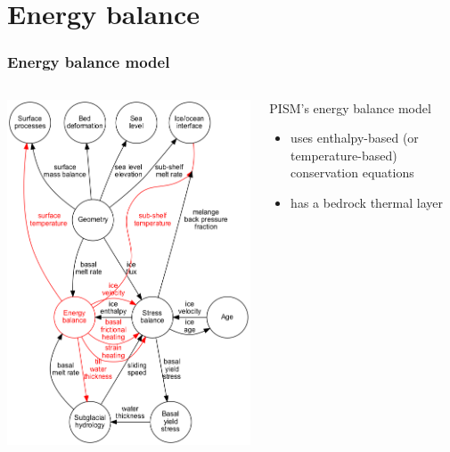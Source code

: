 \documentclass[hide notes,intlimits]{beamer}
\begin{document}
\section{Energy balance}
\label{sec:energy-balance}

\begin{frame}
  \frametitle{Energy balance model}

  \begin{columns}
    \begin{column}{0.45\linewidth}
      \includegraphics[width=\linewidth]{update-4-energy}
    \end{column}
    \begin{column}{0.5\linewidth}
      PISM's energy balance model
      \begin{itemize}
      \item uses enthalpy-based (or temperature-based) conservation
        equations
      \item has a bedrock thermal layer
      \end{itemize}
    \end{column}
  \end{columns}
\end{frame}
\end{document}
